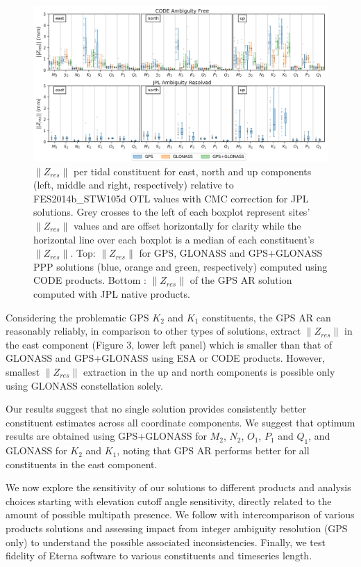 \documentclass[se, manuscript]{copernicus}
\begin{document}
\begin{figure}[t]
\includegraphics[width=17cm]{fig03.png}
\caption{$\|Z_{res}\|$ per tidal constituent for east, north and up components (left, middle and right, respectively) relative to FES2014b\_STW105d OTL values with CMC correction for JPL solutions. Grey crosses to the left of each boxplot represent sites’ $\|Z_{res}\|$ values and are offset horizontally for clarity while the horizontal line over each boxplot is a median of each constituent’s $\|Z_{res}\|$. Top: $\|Z_{res}\|$ for GPS, GLONASS and GPS+GLONASS PPP solutions (blue, orange and green, respectively) computed using CODE products. Bottom : $\|Z_{res}\|$ of the GPS AR solution computed with JPL native products.}
\end{figure}

Considering the problematic GPS $K_2$ and $K_1$ constituents, the GPS AR can reasonably reliably, in comparison to other types of solutions, extract $\|Z_{res}\|$ in the east component (Figure 3, lower left panel) which is smaller than that of GLONASS and GPS+GLONASS using ESA or CODE products. However, smallest $\|Z_{res}\|$ extraction in the up and north components is possible only using GLONASS constellation solely.

Our results suggest that no single solution provides consistently better constituent estimates across all coordinate components. We suggest that optimum results are obtained using GPS+GLONASS for $M_2$, $N_2$, $O_1$, $P_1$ and $Q_1$, and GLONASS for $K_2$ and $K_1$, noting that GPS AR performs better for all constituents in the east component.

We now explore the sensitivity of our solutions to different products and analysis choices starting with elevation cutoff angle sensitivity, directly related to the amount of possible multipath presence. We follow with intercomparison of various products solutions and assessing impact from integer ambiguity resolution (GPS only) to understand the possible associated inconsistencies. Finally, we test fidelity of Eterna software to various constituents and timeseries length. 
\end{document}
